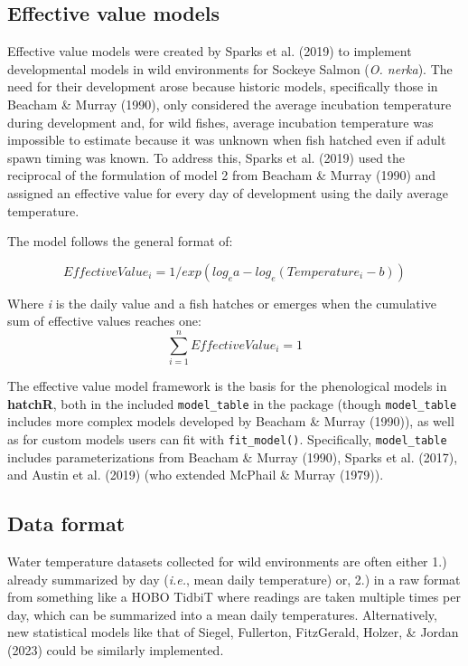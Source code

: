 \documentclass[10pt,a4paper,onecolumn]{article}
\begin{document}
\subsection{Effective value models}\label{effective-value-models}

Effective value models were created by Sparks et al. (2019) to implement
developmental models in wild environments for Sockeye Salmon (\emph{O.
nerka}). The need for their development arose because historic models,
specifically those in Beacham \& Murray (1990), only considered the
average incubation temperature during development and, for wild fishes,
average incubation temperature was impossible to estimate because it was
unknown when fish hatched even if adult spawn timing was known. To
address this, Sparks et al. (2019) used the reciprocal of the
formulation of model 2 from Beacham \& Murray (1990) and assigned an
effective value for every day of development using the daily average
temperature.

The model follows the general format of:

\[
Effective Value_i = 1/exp(log_ea - log_e(Temperature_i - b))
\]

Where \emph{i} is the daily value and a fish hatches or emerges when the
cumulative sum of effective values reaches one:
\[\sum_{i =1}^nEffectiveValue_i = 1\]

The effective value model framework is the basis for the phenological
models in \textbf{hatchR}, both in the included \texttt{model\_table} in
the package (though \texttt{model\_table} includes more complex models
developed by Beacham \& Murray (1990)), as well as for custom models
users can fit with \texttt{fit\_model()}. Specifically,
\texttt{model\_table} includes parameterizations from Beacham \& Murray
(1990), Sparks et al. (2017), and Austin et al. (2019) (who extended
McPhail \& Murray (1979)).

\subsection{Data format}\label{data-format}

Water temperature datasets collected for wild environments are often
either 1.) already summarized by day (\emph{i.e.}, mean daily
temperature) or, 2.) in a raw format from something like a HOBO TidbiT
where readings are taken multiple times per day, which can be summarized
into a mean daily temperatures. Alternatively, new statistical models
like that of Siegel, Fullerton, FitzGerald, Holzer, \& Jordan (2023)
could be similarly implemented.
\end{document}
